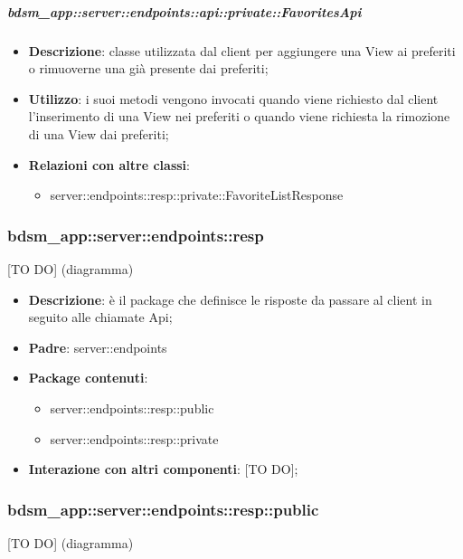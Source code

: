     \subparagraph{bdsm\_app::server::endpoints::api::private::FavoritesApi} %
    \label{subp:bdsm_app_server_endpoints_api_private_favoritesapi}
    \begin{itemize}
      \item \textbf{Descrizione}: classe utilizzata dal client per aggiungere una View ai preferiti o rimuoverne una già presente dai preferiti;
      \item \textbf{Utilizzo}: i suoi metodi vengono invocati quando viene richiesto dal client l'inserimento di una View nei preferiti o quando viene richiesta la rimozione di una View dai preferiti;
      \item \textbf{Relazioni con altre classi}:
        \begin{itemize}
          \item server::endpoints::resp::private::FavoriteListResponse
        \end{itemize}
      \end{itemize}

\subsubsection{bdsm\_app::server::endpoints::resp} %
\label{ssub:bdsm_app_server_endpoints_resp}
[TO DO] (diagramma) \newline \newline

\begin{itemize}
  \item \textbf{Descrizione}: è il package che definisce le risposte da passare al client in seguito alle chiamate Api;
  \item \textbf{Padre}: server::endpoints
  \item \textbf{Package contenuti}:
  	\begin{itemize}
  		\item server::endpoints::resp::public
  		\item server::endpoints::resp::private
	\end{itemize}
  \item \textbf{Interazione con altri componenti}: [TO DO];
\end{itemize}

\subsubsection{bdsm\_app::server::endpoints::resp::public} %
\label{ssub:bdsm_app_server_endpoints_resp_public}
[TO DO] (diagramma) \newline \newline

